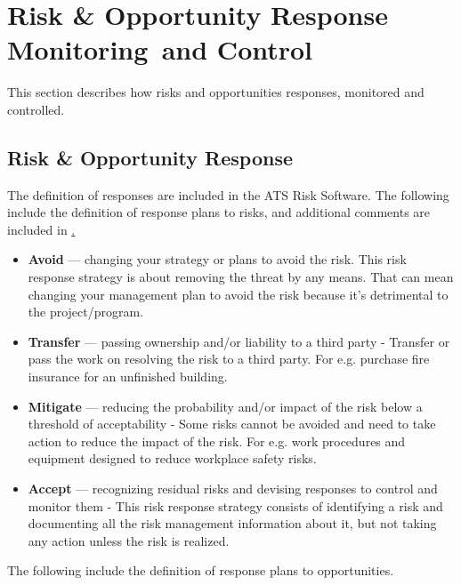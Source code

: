 \section{Risk \& Opportunity Response\, Monitoring\, and Control}

This section describes how risks and opportunities responses, monitored and controlled.

\subsection {Risk \& Opportunity Response}

The definition of responses are included in the ATS Risk Software.
The following include the definition of response plans to risks, and additional comments are included in \href{RTN-051.lsst.io}.

\begin{itemize}
	\item \textbf{Avoid} ---
	changing your strategy or plans to avoid the risk. This risk response strategy is about removing the threat by any means. That can mean changing your management plan to avoid the risk because it’s detrimental to the project/program.

	\item \textbf{Transfer} ---
	passing ownership and/or liability to a third party - Transfer or pass the work on resolving the risk to a third party. For e.g. purchase fire insurance for an unfinished building.

	\item \textbf{Mitigate} ---
	reducing the probability and/or impact of the risk below a threshold of acceptability - Some risks cannot be avoided and need to take action to reduce the impact of the risk. For e.g. work procedures and equipment designed to reduce workplace safety risks.

	\item \textbf{Accept} ---
	recognizing residual risks and devising responses to control and monitor them - This risk response strategy consists of identifying a risk and documenting all the risk management information about it, but not taking any action unless the risk is realized. 
\end{itemize}

The following include the definition of response plans to opportunities.

